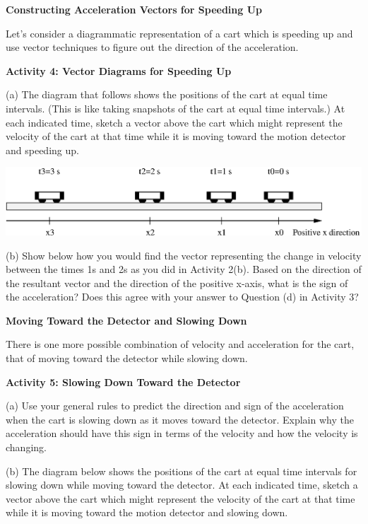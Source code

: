 \textbf{Constructing Acceleration Vectors for Speeding Up} 

Let's consider a diagrammatic representation of a cart which is speeding up
and use vector techniques to figure out the direction of the acceleration.

\vspace{10mm}

\textbf{Activity 4: Vector Diagrams for Speeding Up} 

(a) The diagram that follows shows the positions of the cart at equal time intervals.
(This is like taking snapshots of the cart at equal time intervals.) At each
indicated time, sketch a vector above the cart which might represent the velocity
of the cart at that time while it is moving toward the motion detector and speeding
up.

\vspace{0.3cm}
{\par\centering \includegraphics{slowing/slowing_fig3.eps} \par}
\vspace{0.3cm}

(b) Show below how you would find the vector representing the change in velocity
between the times 1s and 2s as you did in Activity 2(b). Based on the 
direction of the resultant vector and the direction of the positive x-axis, 
what is the sign of the acceleration? 
Does this agree with your answer to Question (d) in Activity 3?
\vspace{20mm}

\textbf{Moving Toward the Detector and Slowing Down }

There is one more possible combination of velocity and acceleration for the
cart, that of moving toward the detector while slowing down. 

\textbf{Activity 5: Slowing Down Toward the Detector} 

(a) Use your general rules to predict the direction and sign of the acceleration
when the cart is slowing down as it moves toward the detector. Explain why the
acceleration should have this sign in terms of the velocity and how the 
velocity is changing. 
\vspace{20mm}

(b) The diagram below shows the positions of the cart at equal time intervals
for slowing down while moving toward the detector. At each indicated time, 
sketch
a vector above the cart which might represent the velocity of the cart at that
time while it is moving toward the motion detector and slowing down.

